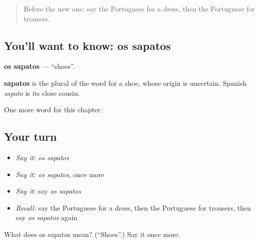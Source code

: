 \begin{quote}
Before the new one: say the Portuguese for a dress, then the Portuguese for trousers.
\end{quote}

\subsection*{You'll want to know: os sapatos}
\textbf{os sapatos} — \textquotedblleft{}shoes\textquotedblright{}.

\begin{cousinweb}
\textbf{sapatos} is the plural of the word for a shoe, whose origin is uncertain. Spanish \emph{zapato} is its close cousin.
\end{cousinweb}

\begin{grammarlens}[title={What you've built}]
One more word for this chapter.
\end{grammarlens}

\subsection*{Your turn}
\begin{itemize}
\raggedright
  \item \emph{Say it:} \emph{os sapatos}
  \item \emph{Say it:} \emph{os sapatos}, once more
  \item \emph{Say it:} say \emph{os sapatos}
  \item \emph{Recall:} say the Portuguese for a dress, then the Portuguese for trousers, then say \emph{os sapatos} again
\end{itemize}

\begin{tcolorbox}[breakable,colback=teal!4,colframe=teal!35!black,title={Before you move on}]
What does os sapatos mean? (\textquotedblleft{}Shoes\textquotedblright{}.) Say it once more.
\end{tcolorbox}
